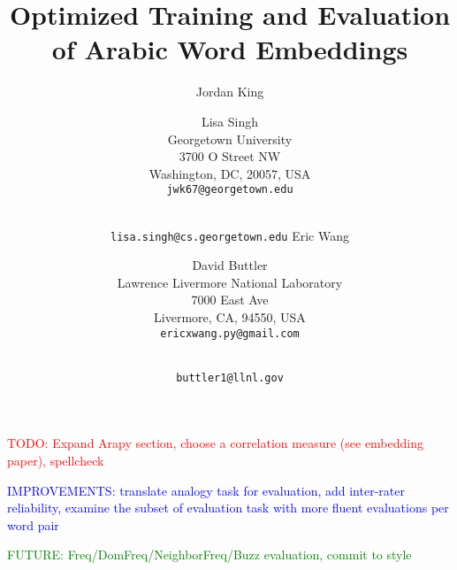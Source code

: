 \documentclass[11pt]{article}
\title{Optimized Training and Evaluation of Arabic Word Embeddings}
\author{Jordan King \and Lisa Singh\\
	    Georgetown University\\
	    3700 O Street NW\\
	    Washington, DC, 20057, USA\\
	    {\tt jwk67@georgetown.edu} \and\\
	    {\tt lisa.singh@cs.georgetown.edu}
	  \And
		Eric Wang \and David Buttler\\
	    Lawrence Livermore National Laboratory\\
	    7000 East Ave\\
	    Livermore, CA, 94550, USA\\
	    {\tt ericxwang.py@gmail.com} \and\\
	    {\tt buttler1@llnl.gov}
	    }
\date{}
\begin{document}
\maketitle

\textcolor{red}{TODO: Expand Arapy section, choose a correlation measure (see embedding paper), spellcheck}

\textcolor{blue}{IMPROVEMENTS: translate analogy task for evaluation, add inter-rater reliability, examine the subset of evaluation task with more fluent evaluations per word pair}

\textcolor{green}{FUTURE: Freq/DomFreq/NeighborFreq/Buzz evaluation, commit to style}















\end{document}
